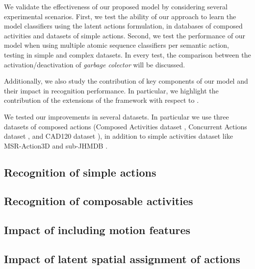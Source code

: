 We validate the effectiveness of our proposed model by considering several experimental scenarios.
First, we test the ability of our approach to learn the model classifiers using the latent actions formulation, in databases of composed activities and datasets of simple actions. 
Second, we test the performance of our model when using multiple atomic sequence  classifiers per semantic action, testing in  simple and complex datasets. In every test, the comparison between the activation/deactivation of \emph{garbage colector} will be discussed.

Additionally, we also study the contribution of key components of our model
and their impact in recognition performance.
In particular, we highlight the contribution of the extensions of the
framework with respect to \cite{Lillo2014}.

We tested our improvements in several datasets. In particular we use three datasets of composed actions (Composed Activities dataset \cite{Lillo2014}, Concurrent Actions dataset \cite{Wei2013}, and CAD120 dataset \cite{Koppula2012}), in addition to simple activities dataset like MSR-Action3D \cite{WanLi2010} and sub-JHMDB \cite{Jhuang2013}.

\subsection{Recognition of simple actions}
\label{subsec:exp_setup}

%

\subsection{Recognition of composable activities}
\label{subsec:experiments_summary}
%

\subsection{Impact of including motion features}
\label{subsec:exp_motionfeats}

\subsection{Impact of latent spatial assignment of actions}
\label{subsec:exp_vlatent}
%

